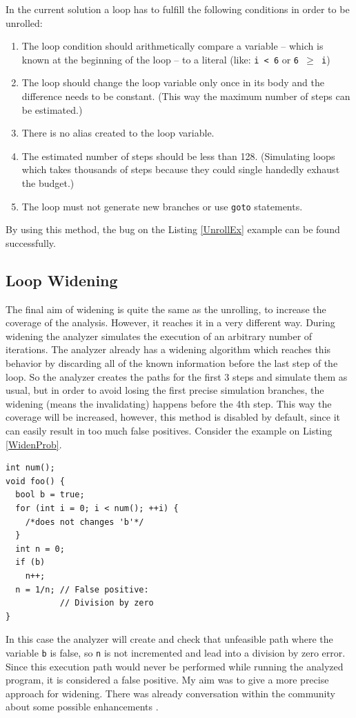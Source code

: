 In the current solution a loop has to fulfill the following conditions in order 
to be unrolled:
\begin{enumerate}  
	\item The loop condition should arithmetically compare a variable -- 
	which is known at the beginning of the loop -- to a literal (like: 				\texttt{i~<~6} or \texttt{6~$\ge$~i})
	\item The loop should change the loop variable only once in its body 
	and the	difference needs to be constant. (This way the maximum number of 
	steps can be estimated.)
    \item There is no alias created to the loop variable.
	\item The estimated number of steps should be less than 128. (Simulating 
	loops which takes thousands of steps because they could single handedly 
	exhaust the budget.)
	\item The loop must not generate new branches or use \texttt{goto} 
	statements.
\end{enumerate}

By using this method, the bug on the Listing \ref{UnrollEx} example can be 
found successfully.

\subsection{Loop Widening}
The final aim of widening is quite the same as the unrolling, to increase 
the coverage of the analysis. However, it reaches it in a very different way. 
During widening the analyzer simulates the execution of an arbitrary number 
of iterations. The analyzer already has a widening algorithm which reaches 
this behavior by discarding all of the known information before the last step 
of the loop. So the analyzer creates the paths for the first 3 steps and 
simulate them as usual, but in order to avoid losing the first precise simulation branches, the widening (means the invalidating) happens 
before the 4th step. 
This way the coverage will be increased, however, this method is disabled by 
default, since it can easily result in too much false positives. Consider the 
example on Listing \ref{WidenProb}.
\\

\begin{lstlisting}
int num();
void foo() {
  bool b = true;
  for (int i = 0; i < num(); ++i) {
    /*does not changes 'b'*/
  }
  int n = 0;
  if (b)
    n++;
  n = 1/n; // False positive:
           // Division by zero
}\end{lstlisting}
In this case the analyzer will create and check that unfeasible path where 
the variable \texttt{b} is false, so \texttt{n} is not incremented and lead 
into a division by zero error. Since this execution path would never be 
performed while running the analyzed program, it is considered a false positive. My aim 
was to give a more precise approach for widening. There was already conversation within the community about some possible enhancements \cite{Widening}.


